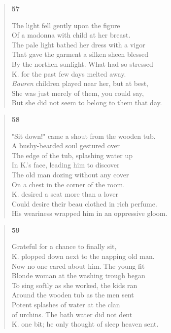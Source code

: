 \documentclass{article}
\begin{document}
\begin{verse}
  \begin{center}
    \textbf{57} \\
  \end{center}
  The light fell gently upon the figure \\
  Of a madonna with child at her breast. \\
  The pale light bathed her dress with a vigor \\
  That gave the garment a silken sheen blessed \\
  By the northen sunlight. What had so stressed \\
  K. for the past few days melted away. \\
  \textit{Bauren} children played near her, but at best, \\
  She was just merely of them, you could say, \\
  But she did not seem to belong to them that day. 
\end{verse}
\begin{verse}
  \begin{center}
    \textbf{58} \\
  \end{center}
  "Sit down!" came a shout from the wooden tub. \\
  A bushy-bearded soul gestured over \\
  The edge of the tub, splashing water up \\
  In K.'s face, leading him to discover \\
  The old man dozing without any cover \\
  On a chest in the corner of the room. \\
  K. desired a seat more than a lover \\
  Could desire their beau clothed in rich perfume. \\
  His weariness wrapped him in an oppressive gloom.
\end{verse}
\begin{verse}
  \begin{center}
    \textbf{59} \\
  \end{center}
  Grateful for a chance to finally sit, \\
  K. plopped down next to the napping old man. \\
  Now no one cared about him. The young fit \\
  Blonde woman at the washing trough began \\
  To sing softly as she worked, the kids ran \\
  Around the wooden tub as the men sent \\
  Potent splashes of water at the clan \\
  of urchins. The bath water did not dent \\
  K. one bit; he only thought of sleep heaven sent.
\end{verse}
\end{document}
